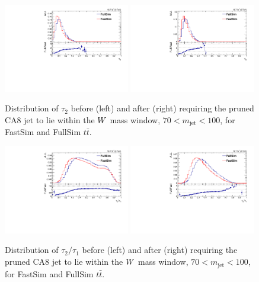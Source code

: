 \begin{figure}[htpb]
\includegraphics[width=0.49\textwidth]{figures/razor_wtag/FastFull_comparison_TTJets_tau2}
\includegraphics[width=0.49\textwidth]{figures/razor_wtag/FastFull_comparison_TTJets_tau2_masscut}
\caption{Distribution of $\tau_2$ before (left) and after (right) requiring the pruned CA8 jet to
lie within the $W$ mass window, $70 < m_{\textrm{jet}} < 100$\GeV, for FastSim and FullSim
$t\bar{t}$.
\label{fig:FastFull_tau2}}
\end{figure}

\begin{figure}[htpb]
\includegraphics[width=0.49\textwidth]{figures/razor_wtag/FastFull_comparison_TTJets_tau21}
\includegraphics[width=0.49\textwidth]{figures/razor_wtag/FastFull_comparison_TTJets_tau21_masscut}
\caption{Distribution of $\tau_2/\tau_1$ before (left) and after (right) requiring the pruned CA8
jet to lie within the $W$ mass window, $70 < m_{\textrm{jet}} < 100$\GeV, for FastSim and FullSim
$t\bar{t}$.
\label{fig:FastFull_tau21}}
\end{figure}

